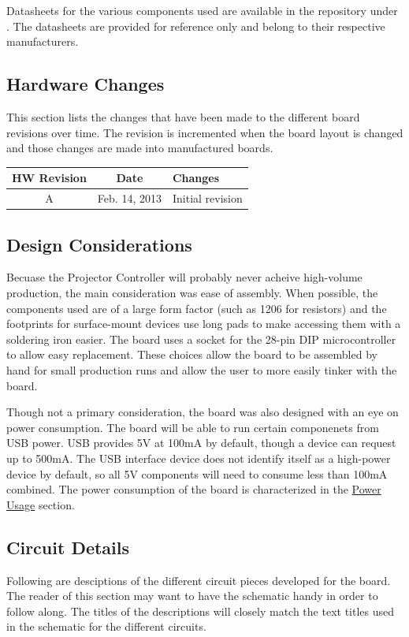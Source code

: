 \documentclass{article}
\begin{document}
Datasheets for the various components used are available in the repository under
.  The datasheets are provided for reference only and belong to their
respective manufacturers.

\subsection{Hardware Changes} \label{ssec:HWChanges}
This section lists the changes that have been made to the different board revisions over time.  The
revision is incremented when the board layout is changed and those changes are made into
manufactured boards.

\begin{center}
    \begin{tabular}{c|c|p{}}
        HW Revision & Date & Changes \\
        \hline
        A & Feb. 14, 2013 & Initial revision \\
    \end{tabular}
\end{center}

\subsection{Design Considerations} \label{ssec:DesignConsid}
Becuase the Projector Controller will probably never acheive high-volume production, the main
consideration was ease of assembly.  When possible, the components used are of a large form factor
(such as 1206 for resistors) and the footprints for surface-mount devices use long pads to make
accessing them with a soldering iron easier.  The board uses a socket for the 28-pin DIP
microcontroller to allow easy replacement.  These choices allow the board to be assembled by hand
for small production runs and allow the user to more easily tinker with the board.

Though not a primary consideration, the board was also designed with an eye on power consumption.
The board will be able to run certain componenets from USB power.  USB provides 5V at 100mA by
default, though a device can request up to 500mA.  The USB interface device does not identify itself
as a high-power device by default, so all 5V components will need to consume less than 100mA
combined.  The power consumption of the board is characterized in the
\hyperref[ssec:PowerUsage]{Power Usage} section.

\subsection{Circuit Details} \label{ssec:CircuitDetails}
Following are desciptions of the different circuit pieces developed for the board.  The reader of
this section may want to have the schematic handy in order to follow along.  The titles of the
descriptions will closely match the text titles used in the schematic for the different circuits.
\end{document}
